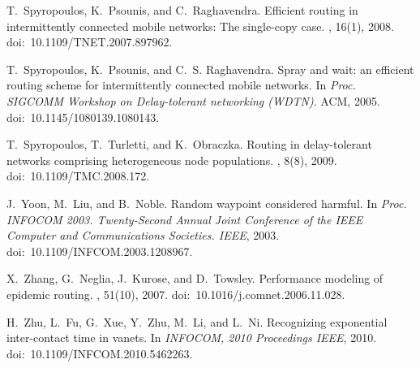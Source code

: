 \documentclass{article}
\begin{document}
\begin{thebibliography}{10}
T.~Spyropoulos, K.~Psounis, and C.~Raghavendra.
\newblock Efficient routing in intermittently connected mobile networks: The
  single-copy case.
, 16(1), 2008.
\newblock doi:~10.1109/TNET.2007.897962.

T.~Spyropoulos, K.~Psounis, and C.~S. Raghavendra.
\newblock Spray and wait: an efficient routing scheme for intermittently
  connected mobile networks.
\newblock In {\em Proc. SIGCOMM Workshop on Delay-tolerant networking (WDTN)}.
  ACM, 2005.
\newblock doi:~10.1145/1080139.1080143.

T.~Spyropoulos, T.~Turletti, and K.~Obraczka.
\newblock Routing in delay-tolerant networks comprising heterogeneous node
  populations.
, 8(8), 2009.
\newblock doi:~10.1109/TMC.2008.172.

J.~Yoon, M.~Liu, and B.~Noble.
\newblock Random waypoint considered harmful.
\newblock In {\em Proc. INFOCOM 2003. Twenty-Second Annual Joint Conference of
  the IEEE Computer and Communications Societies. IEEE}, 2003.
\newblock doi:~10.1109/INFCOM.2003.1208967.

X.~Zhang, G.~Neglia, J.~Kurose, and D.~Towsley.
\newblock Performance modeling of epidemic routing.
, 51(10), 2007.
\newblock doi:~10.1016/j.comnet.2006.11.028.

H.~Zhu, L.~Fu, G.~Xue, Y.~Zhu, M.~Li, and L.~Ni.
\newblock Recognizing exponential inter-contact time in vanets.
\newblock In {\em INFOCOM, 2010 Proceedings IEEE}, 2010.
\newblock doi:~10.1109/INFCOM.2010.5462263.

\end{thebibliography}
\end{document}
